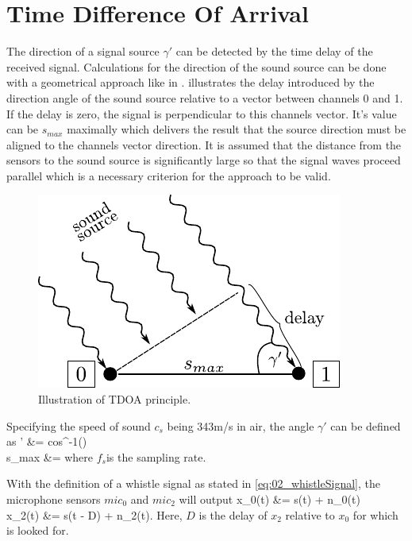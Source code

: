 \section{Time Difference Of Arrival}
\label{sec:02_tdoa}

The direction of a signal source $\gamma'$ can be detected by the time delay of
the received signal.
Calculations for the direction of the sound source can be done with a
geometrical approach like in \cite{Valin_Michaud}.
 illustrates the delay introduced by the direction angle
of the sound source relative to a vector between channels 0 and 1.
If the delay is zero, the signal is perpendicular to this channels vector.
It's value can be $s_{max}$ maximally which delivers the result that the source
direction must be aligned to the channels vector direction.
It is assumed that the distance from the sensors to the sound source is
significantly large so that the signal waves proceed parallel which is a necessary
criterion for the approach to be valid.
\begin{figure}[ht]
	\centering
		\includegraphics[width=0.4\columnwidth]{figures/tdoa_waves}
	\caption{Illustration of TDOA principle.}
    \label{fig:02_tdoa}
\end{figure}

Specifying the speed of sound $c_s$ being 343\si{m/s} in air, the angle
$\gamma'$ can be defined as
\bsub \bal
    \gamma' &= cos^{-1}()
    \label{eq:02_tdoaAngle}\\
    s_{max} &= 
\eal \esub
where $f_s$is the sampling rate.

With the definition of a whistle signal as stated in \cref{eq:02_whistleSignal},
the microphone sensors $mic_0$ and $mic_2$ will output
\bsub \bal
    x_0(t) &= s(t) + n_0(t)\\
    x_2(t) &= \alpha s(t - D) + n_2(t).
\eal \esub
\label{eq:02_signalTimeDomain}
Here, $D$ is the delay of $x_2$ relative to $x_0$ for which is looked for.